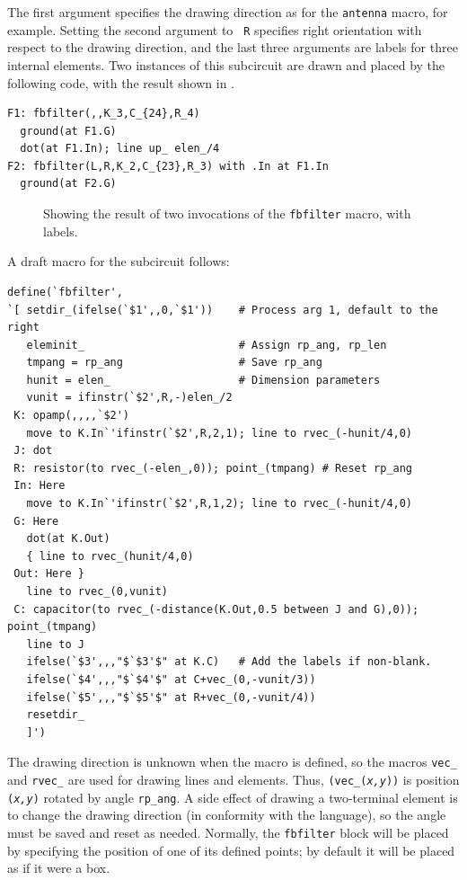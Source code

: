 \noindent The first argument specifies the drawing direction as for the
{\tt antenna} macro, for example.  Setting the second argument to {\tt
R} specifies right orientation with respect to the drawing direction,
and the last three arguments are labels
for three internal elements.  Two instances of this subcircuit are
drawn and placed by the following code, with the result
shown in .
\begin{verbatim}
F1: fbfilter(,,K_3,C_{24},R_4)
  ground(at F1.G)
  dot(at F1.In); line up_ elen_/4
F2: fbfilter(L,R,K_2,C_{23},R_3) with .In at F1.In
  ground(at F2.G)
\end{verbatim}
\vspace*{-0.5em}
\begin{figure}[ht]
   
   \caption{Showing the result of two invocations of the {\tt fbfilter} macro,
     with labels.}
   \label{fbfilter}
   \end{figure}
A draft macro for the subcircuit follows:
\begin{verbatim}
define(`fbfilter',
`[ setdir_(ifelse(`$1',,0,`$1'))    # Process arg 1, default to the right
   eleminit_                        # Assign rp_ang, rp_len
   tmpang = rp_ang                  # Save rp_ang 
   hunit = elen_                    # Dimension parameters
   vunit = ifinstr(`$2',R,-)elen_/2
 K: opamp(,,,,`$2')
   move to K.In`'ifinstr(`$2',R,2,1); line to rvec_(-hunit/4,0)
 J: dot
 R: resistor(to rvec_(-elen_,0)); point_(tmpang) # Reset rp_ang
 In: Here
   move to K.In`'ifinstr(`$2',R,1,2); line to rvec_(-hunit/4,0)
 G: Here
   dot(at K.Out)
   { line to rvec_(hunit/4,0)
 Out: Here } 
   line to rvec_(0,vunit)
 C: capacitor(to rvec_(-distance(K.Out,0.5 between J and G),0)); point_(tmpang)
   line to J
   ifelse(`$3',,,"$`$3'$" at K.C)   # Add the labels if non-blank.
   ifelse(`$4',,,"$`$4'$" at C+vec_(0,-vunit/3))
   ifelse(`$5',,,"$`$5'$" at R+vec_(0,-vunit/4))
   resetdir_
   ]')
\end{verbatim}
The drawing direction is unknown when the macro is defined, so the
macros {\tt vec\_} and {\tt rvec\_} are used for drawing lines and
elements.
Thus, {\tt (vec\_({\sl x,y}))} is position {\tt ({\sl x,y})} rotated
by angle {\tt rp\_ang}.
A side effect of drawing a two-terminal element is to change the
drawing direction (in conformity with the \pic language), so the angle must
be saved and reset as needed. Normally, the {\tt fbfilter} block will be
placed by specifying the position of one of its defined points; by
default it will be placed as if it were a box.
\fi


